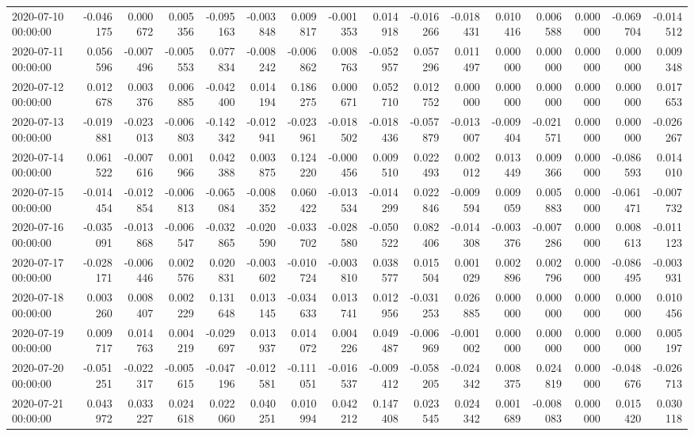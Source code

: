 \begin{tabular}{lrrrrrrrrrrrrrrr}
2020-07-10 00:00:00 & -0.046175 & 0.000672 & 0.005356 & -0.095163 & -0.003848 & 0.009817 & -0.001353 & 0.014918 & -0.016266 & -0.018431 & 0.010416 & 0.006588 & 0.000000 & -0.069704 & -0.014512 \\
2020-07-11 00:00:00 & 0.056596 & -0.007496 & -0.005553 & 0.077834 & -0.008242 & -0.006862 & 0.008763 & -0.052957 & 0.057296 & 0.011497 & 0.000000 & 0.000000 & 0.000000 & 0.000000 & 0.009348 \\
2020-07-12 00:00:00 & 0.012678 & 0.003376 & 0.006885 & -0.042400 & 0.014194 & 0.186275 & 0.000671 & 0.052710 & 0.012752 & 0.000000 & 0.000000 & 0.000000 & 0.000000 & 0.000000 & 0.017653 \\
2020-07-13 00:00:00 & -0.019881 & -0.023013 & -0.006803 & -0.142342 & -0.012941 & -0.023961 & -0.018502 & -0.018436 & -0.057879 & -0.013007 & -0.009404 & -0.021571 & 0.000000 & 0.000000 & -0.026267 \\
2020-07-14 00:00:00 & 0.061522 & -0.007616 & 0.001966 & 0.042388 & 0.003875 & 0.124220 & -0.000456 & 0.009510 & 0.022493 & 0.002012 & 0.013449 & 0.009366 & 0.000000 & -0.086593 & 0.014010 \\
2020-07-15 00:00:00 & -0.014454 & -0.012854 & -0.006813 & -0.065084 & -0.008352 & 0.060422 & -0.013534 & -0.014299 & 0.022846 & -0.009594 & 0.009059 & 0.005883 & 0.000000 & -0.061471 & -0.007732 \\
2020-07-16 00:00:00 & -0.035091 & -0.013868 & -0.006547 & -0.032865 & -0.020590 & -0.033702 & -0.028580 & -0.050522 & 0.082406 & -0.014308 & -0.003376 & -0.007286 & 0.000000 & 0.008613 & -0.011123 \\
2020-07-17 00:00:00 & -0.028171 & -0.006446 & 0.002576 & 0.020831 & -0.003602 & -0.010724 & -0.003810 & 0.038577 & 0.015504 & 0.001029 & 0.002896 & 0.002796 & 0.000000 & -0.086495 & -0.003931 \\
2020-07-18 00:00:00 & 0.003260 & 0.008407 & 0.002229 & 0.131648 & 0.013145 & -0.034633 & 0.013741 & 0.012956 & -0.031253 & 0.026885 & 0.000000 & 0.000000 & 0.000000 & 0.000000 & 0.010456 \\
2020-07-19 00:00:00 & 0.009717 & 0.014763 & 0.004219 & -0.029697 & 0.013937 & 0.014072 & 0.004226 & 0.049487 & -0.006969 & -0.001002 & 0.000000 & 0.000000 & 0.000000 & 0.000000 & 0.005197 \\
2020-07-20 00:00:00 & -0.051251 & -0.022317 & -0.005615 & -0.047196 & -0.012581 & -0.111051 & -0.016537 & -0.009412 & -0.058205 & -0.024342 & 0.008375 & 0.024819 & 0.000000 & -0.048676 & -0.026713 \\
2020-07-21 00:00:00 & 0.043972 & 0.033227 & 0.024618 & 0.022060 & 0.040251 & 0.010994 & 0.042212 & 0.147408 & 0.023545 & 0.024342 & 0.001689 & -0.008083 & 0.000000 & 0.015420 & 0.030118 \\

\end{tabular}

